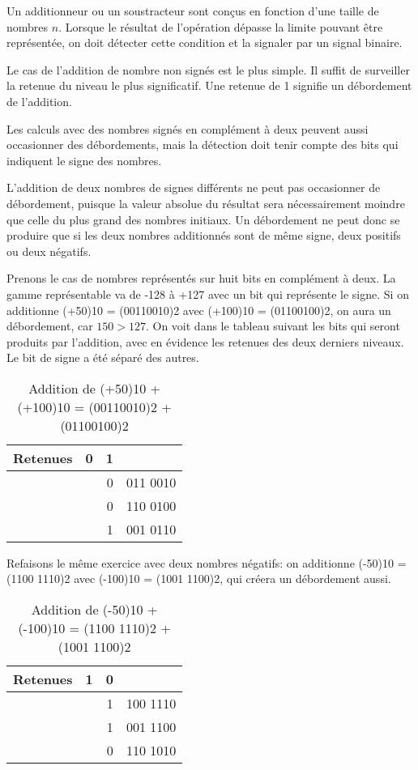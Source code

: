 \documentclass[11pt]{article}
\begin{document}
Un additionneur ou un soustracteur sont conçus en fonction d'une
taille de nombres \(n\). Lorsque le résultat de l'opération dépasse la
limite pouvant être représentée, on doit détecter cette condition et
la signaler par un signal binaire.

Le cas de l'addition de nombre non signés est le plus simple. Il
suffit de surveiller la retenue du niveau le plus significatif. Une
retenue de 1 signifie un débordement de l'addition.

Les calculs avec des nombres signés en complément à deux peuvent aussi
occasionner des débordements, mais la détection doit tenir compte des
bits qui indiquent le signe des nombres.

L'addition de deux nombres de signes différents ne peut pas
occasionner de débordement, puisque la valeur absolue du résultat sera
nécessairement moindre que celle du plus grand des nombres
initiaux. Un débordement ne peut donc se produire que si les deux
nombres additionnés sont de même signe, deux positifs ou deux
négatifs.

Prenons le cas de nombres représentés sur huit bits en complément à
deux. La gamme représentable va de -128 à +127 avec un bit qui
représente le signe. Si on additionne (+50)10 = (00110010)2 avec
(+100)10 = (01100100)2, on aura un débordement, car \(150 > 127\). On
voit dans le tableau suivant les bits qui seront produits par
l'addition, avec en évidence les retenues des deux derniers
niveaux. Le bit de signe a été séparé des autres.

\begin{table}[htbp]
\caption{\label{tab:orgae5992d}Addition de (+50)10 + (+100)10 = (00110010)2 + (01100100)2}
\centering
\begin{tabular}{lrrl}
Retenues & 0 & 1 & \\
\hline
 &  & 0 & 011 0010\\
 &  & 0 & 110 0100\\
\hline
 &  & 1 & 001 0110\\
\end{tabular}
\end{table}

Refaisons le même exercice avec deux nombres négatifs: on additionne
(-50)10 = (1100 1110)2 avec (-100)10 = (1001 1100)2, qui créera un
débordement aussi.

\begin{table}[htbp]
\caption{\label{tab:orgd3fe715}Addition de (-50)10 + (-100)10 = (1100 1110)2 + (1001 1100)2}
\centering
\begin{tabular}{lrrl}
Retenues & 1 & 0 & \\
\hline
 &  & 1 & 100 1110\\
 &  & 1 & 001 1100\\
\hline
 &  & 0 & 110 1010\\
\end{tabular}
\end{table}
\end{document}
